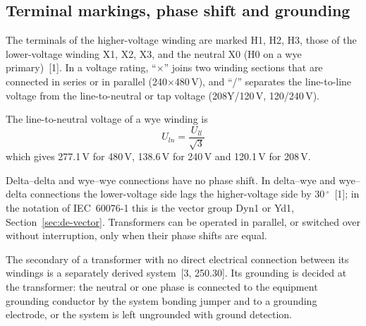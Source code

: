 \subsection{Terminal markings, phase shift and grounding}
\label{sec:na-terms}

The terminals of the higher-voltage winding are marked H1, H2, H3, those of
the lower-voltage winding X1, X2, X3, and the neutral X0 (H0 on a wye
primary)~[1]. In a voltage rating, ``$\times$'' joins two winding
sections that are connected in series or in parallel (240$\times$480\,V),
and ``/'' separates the line-to-line voltage from the line-to-neutral or
tap voltage (208Y/120\,V, 120/240\,V).

The line-to-neutral voltage of a wye winding is
\begin{equation}
  U_{ln} = \frac{U_{ll}}{\sqrt{3}}
  \label{eq:na-uln}
\end{equation}
which gives 277.1\,V for 480\,V, 138.6\,V for 240\,V and 120.1\,V for
208\,V.

Delta--delta and wye--wye connections have no phase shift. In delta--wye and
wye--delta connections the lower-voltage side lags the higher-voltage side
by 30\,$^{\circ}$~[1]; in the notation of IEC~60076-1 this is the
vector group Dyn1 or Yd1, Section~\ref{sec:de-vector}. Transformers can be
operated in parallel, or switched over without interruption, only when
their phase shifts are equal.

The secondary of a transformer with no direct electrical connection between
its windings is a separately derived system~[3, 250.30]. Its grounding is
decided at the transformer: the neutral or one phase is connected to the
equipment grounding conductor by the system bonding jumper and to a
grounding electrode, or the system is left ungrounded with ground
detection.
\FloatBarrier
